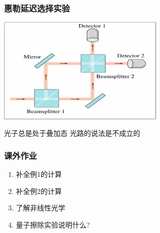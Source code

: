 \begin{frame}
    \frametitle{惠勒延迟选择实验}
    \begin{center}
        \includegraphics[width=0.6\textwidth]{figs/choose.png} \\
    \end{center} 
    {\Bullet} 光子总是处于叠加态
    {\Bullet} 光路的说法是不成立的
\end{frame}

%
%

\begin{frame}
    \frametitle{课外作业}
    \begin{enumerate}
        \item 补全例1的计算
        \item 补全例2的计算
        \item 了解非线性光学
        \item 量子擦除实验说明什么?
    \end{enumerate}
\end{frame}

